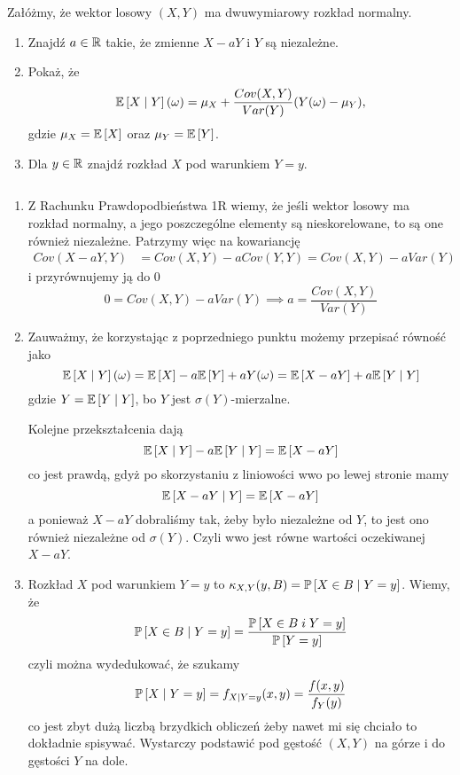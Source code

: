 \begin{problem}
  Załóżmy, że wektor losowy $(X,Y)$ ma dwuwymiarowy rozkład normalny.
  \begin{enumerate}[label=(\alph*)]
    \item Znajdź $a\in\operatorname{\mathbb{R}}$ takie, że zmienne $X-aY$ i $Y$ są niezależne.
    \item Pokaż, że 
      $$\expected{X}{Y}(\omega)=\mu_X+\frac{Cov(X,Y)}{Var(Y)}(Y(\omega)-\mu_Y),$$
      gdzie $\mu_X=\expected{X}$ oraz $\mu_Y=\expected{Y}$.
    \item Dla $y\in\operatorname{\mathbb{R}}$ znajdź rozkład $X$ pod warunkiem $Y=y$.
  \end{enumerate}
\end{problem}

\begin{solution}$ $\vspace{0pt}

  \begin{enumerate}[label=(\alph*)]
    \item Z Rachunku Prawdopodbieństwa 1R wiemy, że jeśli wektor losowy ma rozkład normalny, a jego poszczególne elementy są nieskorelowane, to są one również niezależne. Patrzymy więc na kowariancję
      \begin{align*}
        Cov(X-aY, Y)&=Cov(X, Y)-aCov(Y, Y)=Cov(X, Y)-aVar(Y)
      \end{align*}
      i przyrównujemy ją do $0$
      $$0=Cov(X, Y)-aVar(Y)\implies a=\frac{Cov(X,Y)}{Var(Y)}$$
    \item Zauważmy, że korzystając z poprzedniego punktu możemy przepisać równość jako
      $$\expected{X}{Y}(\omega)=\expected{X}-a\expected{Y}+aY(\omega)=\expected{X-aY}+a\expected{Y}{Y}$$
      gdzie $Y=\expected{Y}{Y}$, bo $Y$ jest $\sigma(Y)$-mierzalne.
      
      Kolejne przekształcenia dają
      $$\expected{X}{Y}-a\expected{Y}{Y}=\expected{X-aY}$$
      co jest prawdą, gdyż po skorzystaniu z liniowości wwo po lewej stronie mamy
      $$\expected{X-aY}{Y}=\expected{X-aY}$$
      a ponieważ $X-aY$ dobraliśmy tak, żeby było niezależne od $Y$, to jest ono również niezależne od $\sigma(Y)$. Czyli wwo jest równe wartości oczekiwanej $X-aY$.
    \item Rozkład $X$ pod warunkiem $Y=y$ to $\kappa_{X,Y}(y,B)=\prob{X\in B}{Y=y}$. Wiemy, że
      $$\prob{X\in B}{Y=y}=\frac{\prob{X\in B\;i\;Y=y}}{\prob{Y=y}}$$
      czyli można wydedukować, że szukamy
      $$\prob{X}{Y=y}=f_{X|Y=y}(x, y)=\frac{f(x, y)}{f_Y(y)}$$
      co jest zbyt dużą liczbą brzydkich obliczeń żeby nawet mi się chciało to dokładnie spisywać. Wystarczy podstawić pod gęstość $(X, Y)$ na górze i do gęstości $Y$ na dole.
  \end{enumerate}
\end{solution}
